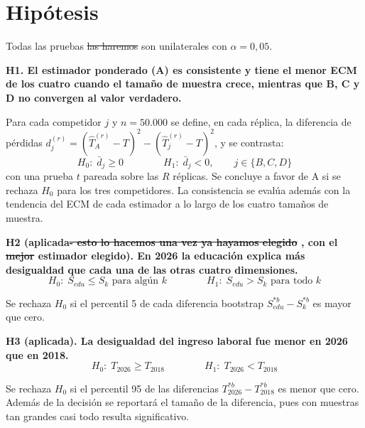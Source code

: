 \documentclass[12pt,letterpaper]{article}
\providecommand{\DIFaddtex}[1]{{\protect\color{BLUE}#1}} %
\providecommand{\DIFdeltex}[1]{{\protect\color{RED}\sout{#1}}} %
\providecommand{\DIFaddtex}[1]{\texorpdfstring{\DIFaddtex{#1}}{#1}} %
\providecommand{\DIFdeltex}[1]{\texorpdfstring{\DIFdeltex{#1}}{}} %
\providecommand{\DIFaddbegin}{}\providecommand{\DIFaddend}{} %
\providecommand{\DIFdelbegin}{}\providecommand{\DIFdelend}{} %
\providecommand{\DIFadd}[1]{\texorpdfstring{\DIFaddtex{#1}}{#1}} %
\providecommand{\DIFdel}[1]{\texorpdfstring{\DIFdeltex{#1}}{}} %
\begin{document}
\section{Hipótesis}

Todas las pruebas \DIFdelbegin \DIFdel{las haremos }\DIFdelend \DIFaddbegin \DIFadd{son unilaterales }\DIFaddend con $\alpha = 0,05$.

\textbf{H1. El estimador ponderado (A) es consistente y tiene el menor ECM de los cuatro cuando el tamaño de muestra crece, mientras que B, C y D no convergen al valor verdadero.}

Para cada competidor $j$ y $n = 50.000$ se define, en cada réplica, la diferencia de pérdidas $d_j^{(r)} = (\hat{T}_A^{(r)} - T)^2 - (\hat{T}_j^{(r)} - T)^2$, y se contrasta:
\begin{equation}
  H_0:\; \bar{d}_j \geq 0 \qquad\qquad H_1:\; \bar{d}_j < 0, \qquad j \in \{B, C, D\}
\end{equation}
con una prueba $t$ \DIFaddbegin \DIFadd{pareada }\DIFaddend sobre las $R$ réplicas. Se concluye a favor de A si se rechaza $H_0$ para los tres competidores. La consistencia se evalúa además con la tendencia del ECM de cada estimador a lo largo de los cuatro tamaños de muestra.

\textbf{H2 (aplicada\DIFdelbegin \DIFdel{- esto lo hacemos una vez ya hayamos elegido }\DIFdelend \DIFaddbegin \DIFadd{, con }\DIFaddend el \DIFdelbegin \DIFdel{mejor }\DIFdelend estimador \DIFaddbegin \DIFadd{elegido}\DIFaddend ). En 2026 la educación explica más desigualdad que cada una de las otras cuatro dimensiones.}
\begin{equation}
  H_0:\; S_{edu} \leq S_k \text{ para algún } k \qquad\qquad
  H_1:\; S_{edu} > S_k \text{ para todo } k
\end{equation}

Se rechaza $H_0$ si el percentil 5 de cada diferencia bootstrap $S_{edu}^{*b} - S_k^{*b}$ es mayor que cero.

\textbf{H3 (aplicada). La desigualdad del ingreso laboral fue menor en 2026 que en 2018.}
\begin{equation}
  H_0:\; T_{2026} \geq T_{2018} \qquad\qquad
  H_1:\; T_{2026} < T_{2018}
\end{equation}

Se rechaza $H_0$ si el percentil 95 de las diferencias $T_{2026}^{*b} - T_{2018}^{*b}$ es menor que cero. Además de la decisión se reportará el tamaño de la diferencia, pues con muestras tan grandes casi todo resulta significativo.
\end{document}
